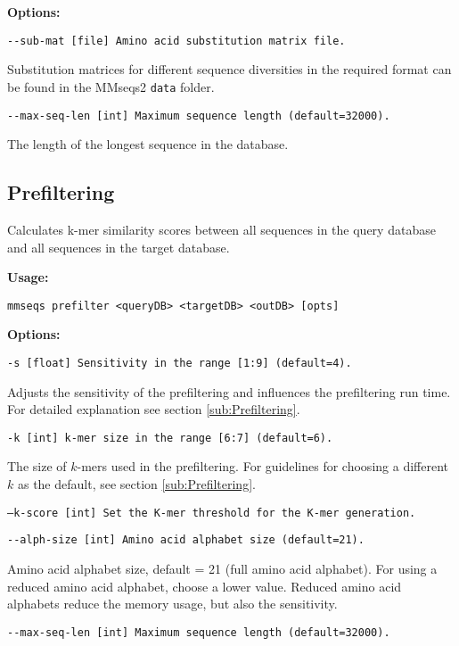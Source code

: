 \documentclass[11pt,a4paper]{scrreprt}
\begin{document}
\textbf{Options:}

\texttt{\small -{}-sub-mat {[}file{]} Amino acid substitution matrix file.}{\small \par}

Substitution matrices for different sequence diversities in the required format can be found in the MMseqs2 \texttt{data} folder.

\texttt{\small -{}-max-seq-len {[}int{]} Maximum sequence length (default=32000).}{\small \par}

The length of the longest sequence in the database.
\subsection{Prefiltering}
Calculates k-mer similarity scores between all sequences in the query database and all sequences in the target database.

\textbf{Usage:}

\texttt{mmseqs prefilter <queryDB> <targetDB> <outDB> {[}opts{]}}

\textbf{Options:}

\texttt{\small -s {[}float{]} Sensitivity in the range {[}1:9{]} (default=4).}{\small \par}

Adjusts the sensitivity of the prefiltering and influences the prefiltering run time. For detailed explanation see section \ref{sub:Prefiltering}.

\texttt{\small -k {[}int{]} k-mer size in the range {[}6:7{]} (default=6).}{\small \par}

The size of $k$-mers used in the prefiltering. For guidelines for choosing a different $k$ as the default, see section \ref{sub:Prefiltering}.

\texttt{\small --k-score {[}int{]}  Set the K-mer threshold for the K-mer generation.}{\small \par}

\texttt{\small -{}-alph-size {[}int{]} Amino acid alphabet size (default=21).}{\small \par}

Amino acid alphabet size, default = 21 (full amino acid alphabet). For using a reduced amino acid alphabet, choose a lower value. Reduced amino acid alphabets reduce the memory usage, but also the sensitivity.

\texttt{\small -{}-max-seq-len {[}int{]} Maximum sequence length (default=32000).}{\small \par}
\end{document}
